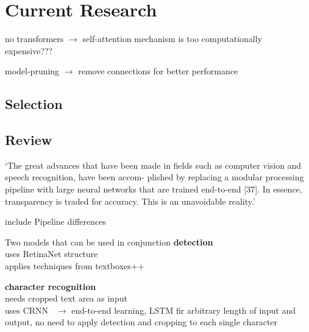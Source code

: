 \chapter{Current Research}\label{ch:research}
no transformers $\rightarrow$ self-attention mechanism is too computationally expensive???

model-pruning $\rightarrow$ remove connections for better performance
\section{Selection}


\section{Review}
`The great advances that have been made in fields such as computer vision and speech recognition,
have been accom- plished by replacing a modular processing pipeline with large neural networks
that are trained end-to-end [37]. In essence, transparency is traded for accuracy.
This is an unavoidable reality.'\citep{arpteg_software_2018}

include Pipeline differences


Two models that can be used in conjunction
\textbf{detection}~\citep{beom_text_2021}\\
uses RetinaNet structure~\citep{lin_focal_2018}\\
applies techniques from textboxes++~\citep{liao_textboxes_2018}

\textbf{character recognition}~\citep{beom_crnn_2021}\\
needs cropped text area as input\\
uses CRNN~\citep{shi_end--end_2015} $\rightarrow$ end-to-end learning, LSTM fir arbitrary length of
input and output, no need to apply detection and cropping to each single character

